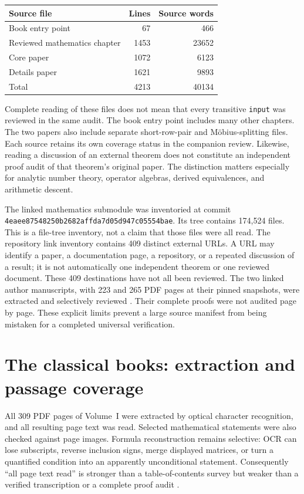 \begin{center}
\begin{tabular}{lrr}
\hline
Source file & Lines & Source words\\
\hline
Book entry point & 67 & 466\\
Reviewed mathematics chapter & 1453 & 23652\\
Core paper & 1072 & 6123\\
Details paper & 1621 & 9893\\
\hline
Total & 4213 & 40134\\
\hline
\end{tabular}
\end{center}

Complete reading of these files does not mean that every transitive
\texttt{input} was reviewed in the same audit. The book entry point includes
many other chapters. The two papers also include separate short-row-pair and
M\"obius-splitting files. Each source retains its own coverage status in the
companion review. Likewise, reading a discussion of an external theorem
does not constitute an independent proof audit of that theorem's original
paper. The distinction matters especially for analytic number theory,
operator algebras, derived equivalences, and arithmetic descent.

The linked mathematics submodule was inventoried at commit
{\small\texttt{4eaee87548\allowbreak{}250b2682af\allowbreak{}fda7d05d94\allowbreak{}7c05554bae}}. Its tree contains
174,524 files. This is a file-tree inventory, not a claim that those files
were all read. The repository link inventory contains 409 distinct external
URLs. A URL may identify a paper, a documentation page, a repository, or a
repeated discussion of a result; it is not automatically one independent
theorem or one reviewed document. These 409 destinations have not all been
reviewed. The two linked author manuscripts, with 223 and 265 PDF pages at
their pinned snapshots, were extracted and selectively reviewed
\cite{SchreiberSurfaceI,SchreiberSurfaceII}. Their complete proofs were not
audited page by page. These explicit limits prevent a large source manifest
from being mistaken for a completed universal verification.

\section{The classical books: extraction and passage coverage}

All 309 PDF pages of Volume~I were extracted by optical character recognition,
and all resulting page text was read. Selected mathematical statements were
also checked against page images. Formula reconstruction remains selective:
OCR can lose subscripts, reverse inclusion signs, merge displayed matrices,
or turn a quantified condition into an apparently unconditional statement.
Consequently ``all page text read'' is stronger than a table-of-contents
survey but weaker than a verified transcription or a complete proof audit
\cite{RoggenkampHuberDyson1970}.


